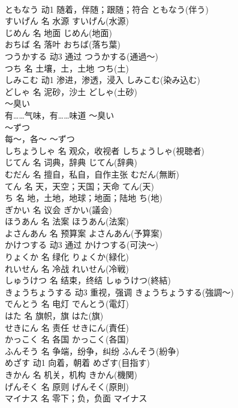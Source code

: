 \documentclass[8pt]{extreport}
\begin{document}
\begin{CJK}{UTF8}{min}
\\	ともなう	动1	随着，伴随；跟随；符合	ともなう(伴う)	
\\	すいげん	名	水源	すいげん(水源)	
\\	じめん	名	地面	じめん(地面)	
\\	おちば	名	落叶	おちば(落ち葉)	
\\	つうかする	动3	通过	つうかする(通過～)	
\\	つち	名	土壤，土，土地	つち(土)	
\\	しみこむ	动1	渗进，渗透，浸入	しみこむ(染み込む)	
\\	どしゃ	名	泥砂，沙土	どしゃ(土砂)	
\\	～臭い	
\\	有……气味，有……味道	～臭い	
\\	～ずつ	
\\	每～，各～	～ずつ	
\\	しちょうしゃ	名	观众，收视者	しちょうしゃ(視聴者)	
\\	じてん	名	词典，辞典	じてん(辞典)	
\\	むだん	名	擅自，私自，自作主张	むだん(無断)	
\\	てん	名	天，天空；天国；天命	てん(天)	
\\	ち	名	地，土地，地球；地面；陆地	ち(地)	
\\	ぎかい	名	议会	ぎかい(議会)	
\\	ほうあん	名	法案	ほうあん(法案)	
\\	よさんあん	名	预算案	よさんあん(予算案)	
\\	かけつする	动3	通过	かけつする(可決～)	
\\	りょくか	名	绿化	りょくか(緑化)	
\\	れいせん	名	冷战	れいせん(冷戦)	
\\	しゅうけつ	名	结束，终结	しゅうけつ(終結)	
\\	きょうちょうする	动3	重视，强调	きょうちょうする(強調～)	
\\	でんとう	名	电灯	でんとう(電灯)	
\\	はた	名	旗帜，旗	はた(旗)	
\\	せきにん	名	责任	せきにん(責任)	
\\	かっこく	名	各国	かっこく(各国)	
\\	ふんそう	名	争端，纷争，纠纷	ふんそう(紛争)	
\\	めざす	动1	向着，朝着	めざす(目指す)	
\\	きかん	名	机关，机构	きかん(機関)	
\\	げんそく	名	原则	げんそく(原則)	
\\	マイナス	名	零下；负，负面	マイナス	

\end{CJK}
\end{document}
